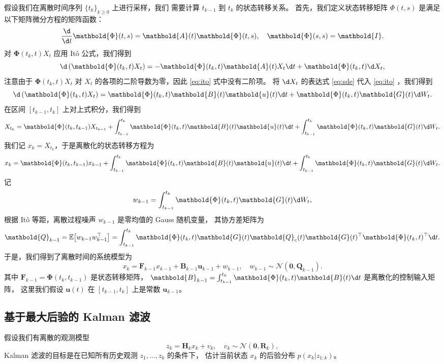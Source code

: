\documentclass[fontset=none,zihao=-4]{Notes}
\newcommand{\mat}[1]{\mathbold{#1}}
\begin{document}
假设我们在离散时间序列 $\{t_k\}_{k\geq 0}$ 上进行采样，我们
需要计算 $t_{k-1}$ 到 $t_k$ 的状态转移关系。
首先，我们定义状态转移矩阵 $\Phi(t,s)$ 是满足以下矩阵微分方程的矩阵函数：
\[
  \frac{\d}{\d t}\mat\Phi(t,s)=\mat{A}(t)\mat\Phi(t,s),\quad \mat\Phi(s,s)=\mat I.
\]
对 $\mat\Phi(t_k,t)X_t$ 应用 It\^o 公式，我们得到
\begin{equation}\label{eq:ito}
    \d\left(
    \mat\Phi(t_k,t)X_t
  \right)=
  -\mat\Phi(t_k,t)\mat A(t)X_t\d t+\mat\Phi(t_k,t)\d X_t,
\end{equation}
注意由于 $\mat\Phi(t_k,t)X_t$ 对 $X_t$ 的各项的二阶导数为零，因此 \eqref{eq:ito} 式中没有二阶项。
将 $\d X_t$ 的表达式 \eqref{eq:sde} 代入 \eqref{eq:ito} ，我们得到
\[
  \d\left(
    \mat\Phi(t_k,t)X_t
  \right)=
  \mat\Phi(t_k,t)\mat B(t)\mat u(t)\d t+\mat\Phi(t_k,t)\mat G(t)\d W_t.
\]
在区间 $[t_{k-1},t_k]$ 上对上式积分，我们得到
\[
  X_{t_k}=\mat\Phi(t_k,t_{k-1})X_{t_{k-1}}+\int_{t_{k-1}}^{t_k}\mat\Phi(t_k,t)\mat B(t)\mat u(t)\d t+\int_{t_{k-1}}^{t_k}\mat\Phi(t_k,t)\mat G(t)\d W_t.
\]
我们记 $x_k=X_{t_k}$，于是离散化的状态转移方程为
\begin{equation}\label{eq:discrete}
  x_k=\mat\Phi(t_k,t_{k-1})x_{k-1}+\int_{t_{k-1}}^{t_k}\mat\Phi(t_k,t)\mat B(t)\mat u(t)\d t+\int_{t_{k-1}}^{t_k}\mat\Phi(t_k,t)\mat G(t)\d W_t.
\end{equation}
记
\[
  w_{k-1}=\int_{t_{k-1}}^{t_k}\mat\Phi(t_k,t)\mat G(t)\d W_t,
\]
根据 It\^o 等距，离散过程噪声 $w_{k-1}$ 是零均值的 Gauss 随机变量，
其协方差矩阵为
\begin{equation}\label{eq:cov}
  \mat Q_{k-1}=\mathbb{E}\bigl[w_{k-1}w_{k-1}^\top\bigr]=\int_{t_{k-1}}^{t_k}\mat\Phi(t_k,t)\mat G(t)\mat Q_c(t)\mat G(t)^\top\mat\Phi(t_k,t)^\top\d t.
\end{equation}
于是，我们得到了离散时间的系统模型为
\begin{equation}\label{eq:discrete2}
  x_k=\mat F_{k-1}x_{k-1}+\mat B_{k-1}\mat u_{k-1}+w_{k-1},\quad
  w_{k-1}\sim \mathcal{N}(\mat 0,\mat Q_{k-1}).
\end{equation}
其中 $\mat F_{k-1}=\mat\Phi(t_k,t_{k-1})$ 是状态转移矩阵，
$\mat B_{k-1}=\int_{t_{k-1}}^{t_k}\mat\Phi(t_k,t)\mat B(t)\d t$ 是离散化的控制输入矩阵，
这里我们假设 $\mat u(t)$ 在 $[t_{k-1},t_k]$ 上是常数 $\mat u_{k-1}$。

\subsection{基于最大后验的 Kalman 滤波}\label{subsec:map}

假设我们有离散的观测模型
\begin{equation}\label{eq:obs}
  z_k=\mat H_kx_k+v_k,\quad v_k\sim \mathcal{N}(\mat 0,\mat R_k),
\end{equation}
Kalman 滤波的目标是在已知所有历史观测 $z_1,\ldots,z_k$ 的条件下，
估计当前状态 $x_k$ 的后验分布 $p(x_k|z_{1:k})$。
\end{document}
